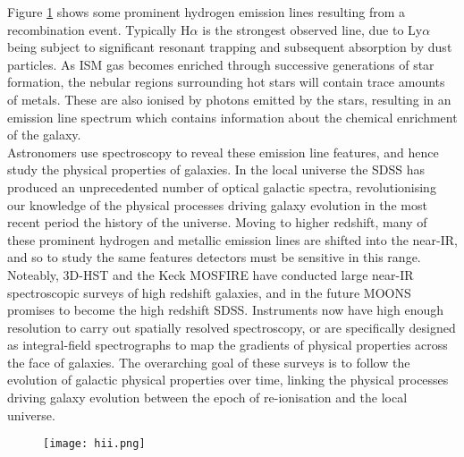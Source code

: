 \documentclass{literature}
\begin{document}
Figure \ref{fig:hii_regions} shows some prominent hydrogen emission lines resulting from a recombination event. Typically H$\alpha$ is the strongest observed line, due to Ly$\alpha$ being subject to significant resonant trapping and subsequent absorption by dust particles. As ISM gas becomes enriched through successive generations of star formation, the nebular regions surrounding hot stars will contain trace amounts of metals. These are also ionised by photons emitted by the stars, resulting in an emission line spectrum which contains information about the chemical enrichment of the galaxy. \\ 
Astronomers use spectroscopy to reveal these emission line features, and hence study the physical properties of galaxies. In the local universe the SDSS \citep{Ahn2014} has produced an unprecedented number of optical galactic spectra, revolutionising our knowledge of the physical processes driving galaxy evolution in the most recent period the history of the universe. Moving to higher redshift, many of these prominent hydrogen and metallic emission lines are shifted into the near-IR, and so to study the same features detectors must be sensitive in this range. Noteably, 3D-HST \citep{Brammer2012} and the Keck MOSFIRE \citep{McLean2012} have conducted large near-IR spectroscopic surveys of high redshift galaxies, and in the future MOONS \citep{Cirasuolo2011} promises to become the high redshift SDSS. Instruments now have high enough resolution to carry out spatially resolved spectroscopy, or are specifically designed as integral-field spectrographs to map the gradients of physical properties across the face of galaxies. The overarching goal of these surveys is to follow the evolution of galactic physical properties over time, linking the physical processes driving galaxy evolution between the epoch of re-ionisation and the local universe.        

\begin{figure}[!htp]
\centering
\texttt{[image: hii.png]}
\caption{\footnotesize{\emph{ \citep{Ferguson2014}}}}
\label{fig:hii_regions}
\end{figure} 
  
\end{document}
